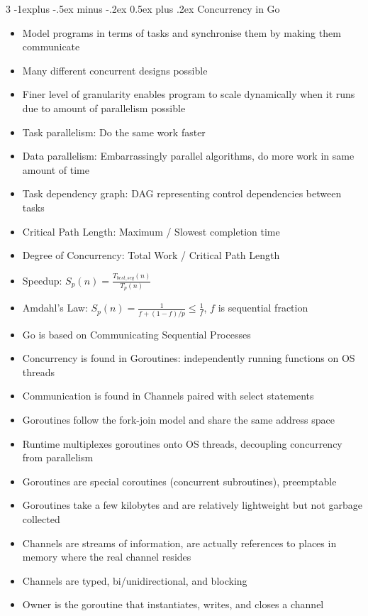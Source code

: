 \documentclass[10pt, landscape]{article}
\makeatletter
\renewcommand{\section}{\@startsection{section}{1}{0mm}%
                                {-1ex plus -.5ex minus -.2ex}%
                                {0.5ex plus .2ex}%
                                {\normalfont\large\bfseries}}
\renewcommand{\section}{\@startsection{section}{2}{0mm}%
                                {-1explus -.5ex minus -.2ex}%
                                {0.5ex plus .2ex}%
                                {\normalfont\normalsize\bfseries}}
\makeatother
\begin{document}
\begin{multicols*}{3}
\section{Concurrency in Go}
\begin{itemize}
    \item Model programs in terms of tasks and synchronise them by making them communicate
    \item Many different concurrent designs possible
    \item Finer level of granularity enables program to scale dynamically when it runs due to amount of parallelism possible
    \item Task parallelism: Do the same work faster
    \item Data parallelism: Embarrassingly parallel algorithms, do more work in same amount of time
    \item Task dependency graph: DAG representing control dependencies between tasks
    \item Critical Path Length: Maximum / Slowest completion time
    \item Degree of Concurrency: Total Work / Critical Path Length
    \item Speedup: $S_p(n)=\frac{T_{best\_seq}(n)}{T_p(n)}$
    \item Amdahl's Law: $S_p(n)=\frac{1}{f+(1-f)/p} \leq \frac{1}{f}$, $f$ is sequential fraction
    \item Go is based on Communicating Sequential Processes
    \item Concurrency is found in Goroutines: independently running functions on OS threads
    \item Communication is found in Channels paired with select statements
    \item Goroutines follow the fork-join model and share the same address space
    \item Runtime multiplexes goroutines onto OS threads, decoupling concurrency from parallelism
    \item Goroutines are special coroutines (concurrent subroutines), preemptable
    \item Goroutines take a few kilobytes and are relatively lightweight but not garbage collected
    \item Channels are streams of information, are actually references to places in memory where the real channel resides
    \item Channels are typed, bi/unidirectional, and blocking
    \item Owner is the goroutine that instantiates, writes, and closes a channel

\end{itemize}
\end{multicols*}
\end{document}
